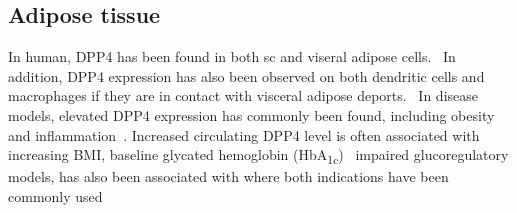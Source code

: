 \subsection{Adipose tissue}
In human, DPP4 has been found in both sc and viseral adipose cells.~\cite{Lamers2011} In addition, DPP4 expression has also been observed on both dendritic cells and macrophages if they are in contact with visceral adipose deports.~\cite{Zhong2013} In disease models, elevated DPP4 expression has commonly been found, including obesity and inflammation~\cite{Zhong2013}. Increased circulating DPP4 level is often associated with increasing BMI, baseline glycated hemoglobin (HbA\textsubscript{1c})~\cite{2011}  impaired glucoregulatory models,  has also been associated with where both indications have been commonly used 